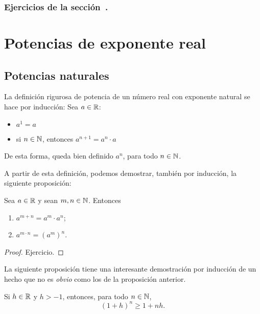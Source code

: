 \subsubsection*{Ejercicios de la sección~.}

\begin{enumerate}

\end{enumerate}

\section{Potencias de exponente real}

\subsection{Potencias naturales}

La definición rigurosa de potencia de un número real con exponente natural se hace por inducción:
Sea $a\in\mathbb{R}$:
\begin{itemize}
    \item $a^1 = a$
    \item si $n\in \mathbb{N}$, entonces $a^{n+1} = a^n \cdot a$
\end{itemize}
De esta forma, queda bien definido $a^n$, para todo $n \in \mathbb{N}$.

A partir de esta definición, podemos demostrar, también por inducción, la siguiente proposición:

\begin{proposition}\label{P:potencias naturales}
    Sea $a\in\mathbb{R}$ y sean $m,n\in \mathbb{N}$. Entonces
    \begin{enumerate}[{\rm (i)}]
        \item $a^{m+n} = a^m \cdot a^n$;
        \item $a^{m\cdot n} = (a^m)^n$.
    \end{enumerate}
\end{proposition}

\begin{proof}
    Ejercicio.
\end{proof}

La siguiente proposición tiene una interesante demostración por inducción de un hecho que no es \emph{obvio} como los de la proposición anterior.

\begin{proposition}\label{P:Bernoulli}
    Si $h \in \mathbb{R}$ y $h > -1$, entonces, para todo $n \in \mathbb{N}$,
    \[
    (1+h)^n \ge 1 + n h.
    \]
\end{proposition}

